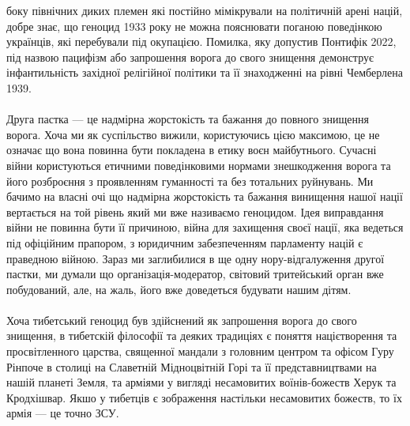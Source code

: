 боку північних диких племен які постійно мімікрували на політичній арені націй, добре
знає, що геноцид 1933 року не можна пояснювати поганою поведінкою українців, які
перебували під окупацією. Помилка, яку допустив Понтифік 2022, під назвою пацифізм
або запрошення ворога до свого знищення демонструє інфантильність західної релігійної
політики та її знаходженні на рівні Чемберлена 1939.
\\
\\
Друга пастка --- це надмірна жорстокість та бажання до повного знищення ворога.
Хоча ми як суспільство вижили, користуючись цією максимою, це не означає що вона
повинна бути покладена в етику воєн майбутнього. Сучасні війни користуються етичними
поведінковими нормами знешкодження ворога та його розброєння з проявленням гуманності
та без тотальних руйнувань. Ми бачимо на власні очі що надмірна жорстокість та бажання
винищення нашої нації вертається на той рівень який ми вже називаємо геноцидом. Ідея
виправдання війни не повинна бути її причиною, війна для захищення своєї нації, яка
ведеться під офіційним прапором, з юридичним забезпеченням парламенту націй є
праведною війною. Зараз ми заглибилися в ще одну нору-відгалуження другої пастки,
ми думали що організація-модератор, світовий тритейський орган вже побудований,
але, на жаль, його вже доведеться будувати нашим дітям.
\\
\\
Хоча тибетський геноцид був здійснений як запрошення ворога до свого знищення,
в тибетскій філософії та деяких традиціях є поняття націєтворення та просвітленного
царства, священної мандали з головним центром та офісом Гуру Рінпоче в столиці на
Славетній Мідноцвітній Горі та її представництвами на нашій планеті Земля, та
арміями у вигляді несамовитих воїнів-божеств Херук та Кродхішвар. Якшо у тибетців
є зображення настільки несамовитих божеств, то їх армія --- це точно ЗСУ.

